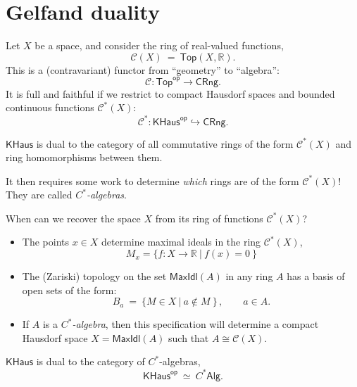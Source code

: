\documentclass[lambek.tex]{subfiles}
\begin{document}
\section{Gelfand duality}
Let $X$ be a  space, and consider the ring of real-valued functions,
\[
 \mathcal{C}(X)\ =\ \mathsf{Top}(X, \mathbb{R}).
 \]
 This  is a (contravariant) functor from ``geometry'' to ``algebra'':
 \[
 \mathcal{C} : \mathsf{Top}^\mathsf{op} \to \mathsf{CRng}.
 \]
%
It is full and faithful if we restrict to compact Hausdorf spaces and bounded continuous functions  $\mathcal{C}^*(X)$:
  \[
 \mathcal{C}^* : \mathsf{KHaus}^\mathsf{op} \hookrightarrow \mathsf{CRng}.
 \]
 \begin{theorem}
 $\mathsf{KHaus}$ is dual to the category of all commutative rings of the form  $\mathcal{C}^*(X)$ and ring homomorphisms between them.
 \end{theorem}
 \medskip
 
 It then requires some work to  determine \emph{which} rings are of the form $\mathcal{C}^*(X)$!  
 They are called \emph{$C^*$-algebras}.

When can we recover the space $X$ from its ring of functions $\mathcal{C}^*(X)$?

\begin{itemize}
\item The points  $x\in X$ determine maximal ideals in the ring $\mathcal{C}^*(X)$,
\[
M_x = \{ f : X\to \mathbb{R}\ |\ f(x) = 0\ \}
\]
\item The (Zariski) topology on the set $\mathsf{MaxIdl}(A)$ in any ring $A$ has a basis of open sets of the form:
\[
B_a\ =\ \{M \in X\ |\ a\notin M\ \}\, ,\qquad a\in A.
\]
\item If $A$ is a \emph{$C^*$-algebra}, then this specification will determine a compact Hausdorf space $X = \mathsf{MaxIdl}(A)$ such that $A\cong \mathcal{C}(X)$.
\end{itemize}

 \begin{theorem}
 $\mathsf{KHaus}$ is dual to the category of $C^*$-algebras,
 \[
\mathsf{KHaus}^\mathsf{op}\ \simeq\ C^*\mathsf{Alg}.
 \]
 \end{theorem}
\end{document}
